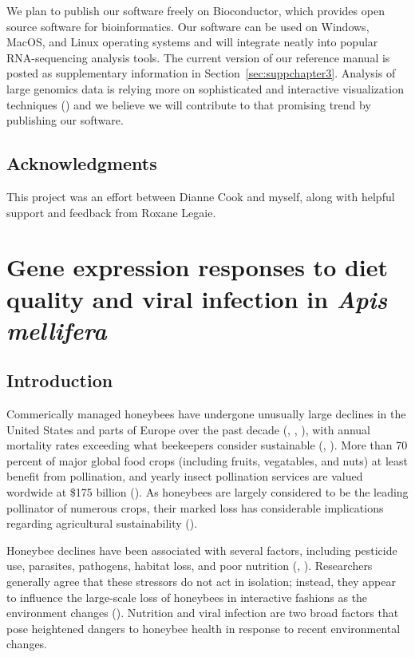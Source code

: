 \documentclass[11pt,a4paper,oldfontcommands,openany]{memoir}
\numberwithin{equation}{section} %
\begin{document}
We plan to publish our software freely on Bioconductor, which provides open source software for bioinformatics. Our software can be used on Windows, MacOS, and Linux operating systems and will integrate neatly into popular RNA-sequencing analysis tools. The current version of our reference manual is posted as supplementary information in Section~\ref{sec:suppchapter3}. Analysis of large genomics data is relying more on sophisticated and interactive visualization techniques (\citealt{vizReview}) and we believe we will contribute to that promising trend by publishing our software.

\section{Acknowledgments}

This project was an effort between Dianne Cook and myself, along with helpful support and feedback from Roxane Legaie.


\chapter{Gene expression responses to diet quality and viral infection in \textit{Apis mellifera}}
\label{sec:chapter4}

\section{Introduction}

Commerically managed honeybees have undergone unusually large declines in the United States and parts of Europe over the past decade (\citealt{ccd1}, \citealt{ccd2}, \citealt{ccd3}), with annual mortality rates exceeding what beekeepers consider sustainable (\citealt{ccd5}, \citealt{ccd6}). More than 70 percent of major global food crops (including fruits, vegatables, and nuts) at least benefit from pollination, and yearly insect pollination services are valued wordwide at \$175 billion (\citealt{ccd7}). As honeybees are largely considered to be the leading pollinator of numerous crops, their marked loss has considerable implications regarding agricultural sustainability (\citealt{ccd4}).

Honeybee declines have been associated with several factors, including pesticide use, parasites, pathogens, habitat loss, and poor nutrition (\citealt{factors}, \citealt{factors2}). Researchers generally agree that these stressors do not act in isolation; instead, they appear to influence the large-scale loss of honeybees in interactive fashions as the environment changes (\citealt{interacting}). Nutrition and viral infection are two broad factors that pose heightened dangers to honeybee health in response to recent environmental changes.
\end{document}

